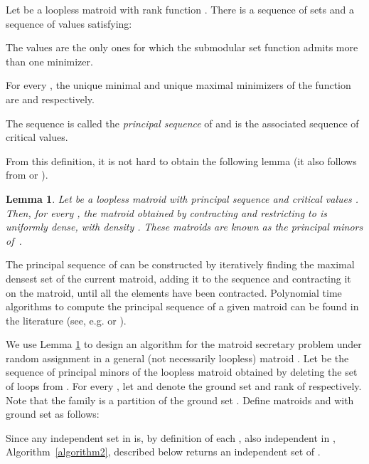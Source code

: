 \documentclass[letterpaper,11pt]{article}
\newtheorem{lem}[thm]{Lemma}
\theoremstyle{definition}
\theoremstyle{remark}
\begin{document}
\begin{thm}\label{thm:ppalsequence}
Let  be a loopless matroid with rank function . There is a sequence of sets  and a sequence of values  satisfying:
\begin{compactenum}
  \item The values  are the only ones for which the submodular set function  admits more than one minimizer.
  \item For every , the unique minimal and unique maximal minimizers of the function  are  and  respectively.
\end{compactenum}
The sequence  is called the \emph{principal sequence} of  and  is the associated sequence of critical values.
\end{thm}

From this definition, it is not hard to obtain the following lemma (it also follows from \cite[Theorem 3.11]{fujishige2009theory} or \cite{catlin1992fractional}).

\begin{lem}\label{lem:Density} Let  be a loopless matroid with principal sequence  and critical values . Then, for every , the matroid  obtained by contracting  and restricting to  is uniformly dense, with density . These matroids are known as the \emph{principal minors} of~.
\end{lem}

The principal sequence of  can be constructed by iteratively finding the maximal densest set  of the current matroid, adding it to the sequence and contracting it on the matroid, until all the elements have been contracted. Polynomial time algorithms to compute the principal sequence of a given matroid can be found in the literature (see, e.g. \cite{narayanan1981elementary} or \cite[chapters 10,11]{narayanan1997submodular}).

We use Lemma \ref{lem:Density} to design an algorithm for the matroid secretary problem under random assignment in a general (not necessarily loopless) matroid . Let  be the sequence of principal minors of the loopless matroid obtained by deleting the set  of loops from . For every , let  and  denote the ground set and rank of  respectively. Note that the family  is a partition of the ground set . Define matroids  and  with ground set  as follows:


Since any independent set in  is, by definition of each , also independent in , Algorithm~\ref{algorithm2}, described below returns an independent set of .
\end{document}
